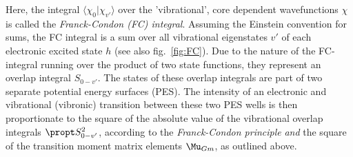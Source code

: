 			Here, the integral $\langle\chi_0|\chi_{v'}\rangle$ over the 'vibrational', core dependent wavefunctions $\chi$ is called the \emph{Franck-Condon (FC) integral}. Assuming the Einstein convention for sums, the FC integral is a sum over all vibrational eigenstates $v'$ of each electronic excited state $h$ (see also fig.~\ref{fig:FC}). Due to the nature of the FC-integral running over the product of two state functions, they represent an overlap integral $S_{0-v'}$. The states of these overlap integrals are part of two separate potential energy surfaces (PES). The intensity of an electronic and vibrational (vibronic) transition between these two PES wells is then proportionate to the square of the absolute value of the vibrational overlap integrals $\propt S_{0-v'}^2$, according to the \emph{Franck-Condon principle} \emph{and} the square of the transition moment matrix elements $\Mu_{Gm}$, as outlined above.

